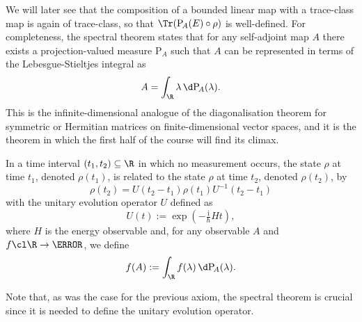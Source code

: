     We will later see that the composition of a bounded linear map with a trace-class map is again of trace-class, so that $\Tr(\mathrm{P}_{\!A}(E)\circ\rho)$ is well-defined. For completeness, the spectral theorem states that for any self-adjoint map $A$ there exists a projection-valued measure $\mathrm{P}_{\!A}$ such that $A$ can be represented in terms of the Lebesgue-Stieltjes integral as
    \begin{equation*}
        A = \int_{\R}\lambda \, \d \mathrm{P}_{\!A}(\lambda).
    \end{equation*}
    This is the infinite-dimensional analogue of the diagonalisation theorem for symmetric or Hermitian matrices on finite-dimensional vector spaces, and it is the theorem in which the first half of the course will find its climax.

    \begin{tcolorbox}[colframe=blue!10!black,before skip=10pt]
        \begin{axiom}
            In a time interval $(t_1,t_2)\subseteq \R$ in which no measurement occurs, the state $\rho$ at time $t_1$, denoted $\rho(t_1)$, is related to the state $\rho$ at time $t_2$, denoted $\rho(t_2)$, by
            \begin{equation*}
                \rho(t_2) = U(t_2-t_1)\rho(t_1) U^{-1}(t_2-t_1)
            \end{equation*}
            with the unitary evolution operator $U$ defined as
            \begin{equation*}
                U(t) := \exp(-\tfrac{\mathrm{i}}{\hbar}Ht),
            \end{equation*}
            where $H$ is the energy observable and, for any observable $A$ and $f\cl \R\to \C$, we define
            \begin{equation*}
                f(A):=\int_\R f(\lambda) \, \d \mathrm{P}_{\!A}(\lambda).
            \end{equation*}
        \end{axiom}
    \end{tcolorbox}
    Note that, as was the case for the previous axiom, the spectral theorem is crucial since it is needed to define  the unitary evolution operator.

